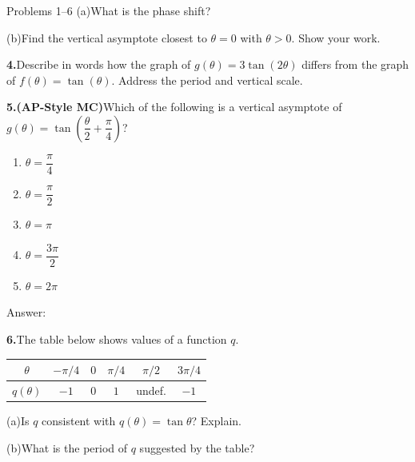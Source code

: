 \documentclass[10pt]{article}
\begin{document}
\begin{notesbox}{Problems 1--6}
\vspace{4pt}
(a)\quad What is the phase shift?
\writeline

\vspace{4pt}
(b)\quad Find the vertical asymptote closest to $\theta = 0$ with $\theta > 0$.
Show your work.

\vspace{0.12in}
\textbf{4.}\quad Describe in words how the graph of $g(\theta) = 3\tan(2\theta)$
differs from the graph of $f(\theta) = \tan(\theta)$.  Address the period and
vertical scale.

\vspace{0.12in}
\textbf{5.}\quad \textbf{(AP-Style MC)}\quad Which of the following is a vertical
asymptote of $g(\theta) = \tan\!\left(\dfrac{\theta}{2} + \dfrac{\pi}{4}\right)$?

\begin{enumerate}[label=(\Alph*), leftmargin=2em, itemsep=3pt]
  \item $\theta = \dfrac{\pi}{4}$
  \item $\theta = \dfrac{\pi}{2}$
  \item $\theta = \pi$
  \item $\theta = \dfrac{3\pi}{2}$
  \item $\theta = 2\pi$
\end{enumerate}

Answer: \underline{\hspace{1.5cm}}

\vspace{0.12in}
\textbf{6.}\quad The table below shows values of a function $q$.

\vspace{4pt}
\begin{center}
\renewcommand{\arraystretch}{1.4}
\begin{tabular}{|c|c|c|c|c|c|}
\hline
$\theta$ & $-\pi/4$ & $0$ & $\pi/4$ & $\pi/2$ & $3\pi/4$ \\
\hline
$q(\theta)$ & $-1$ & $0$ & $1$ & undef. & $-1$ \\
\hline
\end{tabular}
\end{center}

\vspace{4pt}
(a)\quad Is $q$ consistent with $q(\theta) = \tan\theta$?  Explain.

(b)\quad What is the period of $q$ suggested by the table?
\writeline

\end{notesbox}
\end{document}
